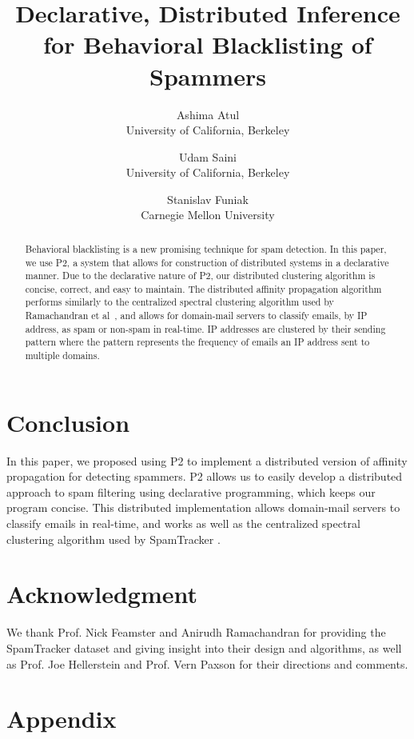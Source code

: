 \documentclass[letterpaper,twocolumn,11pt]{article}
\title{Declarative, Distributed Inference for Behavioral Blacklisting of Spammers}
\author{%
  {\rm Ashima Atul} \\ University of California, Berkeley \and {\rm Udam Saini} \\ University of California, Berkeley \and
  {\rm Stanislav Funiak} \\ Carnegie Mellon University
}
\date{}
\begin{document}
 
 
\maketitle 

\begin{abstract} 
Behavioral blacklisting is a new promising technique for spam detection. In this paper, we use P2, a system that allows for construction of distributed systems in a declarative manner. Due to the declarative nature of P2, our distributed clustering algorithm is concise, correct, and easy to maintain. The distributed affinity propagation algorithm performs similarly to the centralized spectral clustering algorithm used by Ramachandran et al~\cite{bb}, and allows for domain-mail servers to classify emails, by IP address, as spam or non-spam in real-time. IP addresses are clustered by their sending pattern where the pattern represents the frequency of emails an IP address sent to multiple domains.
\end{abstract}








\section{Conclusion}
\label{concl}
In this paper, we proposed using P2 to implement a distributed version of affinity propagation for detecting spammers. P2 allows us to easily develop a distributed approach to spam filtering using declarative programming, which keeps our program concise. This distributed implementation allows domain-mail servers to classify emails in real-time, and works as well as the centralized spectral clustering algorithm used by SpamTracker \cite{bb}. 
\section{Acknowledgment}
We thank Prof. Nick Feamster and Anirudh Ramachandran for providing the SpamTracker dataset and giving insight into their design and algorithms, as well as Prof. Joe Hellerstein and Prof. Vern Paxson for their directions and comments.


\small{}

\appendix
\section{Appendix}
\label{appendix}
\end{document}

